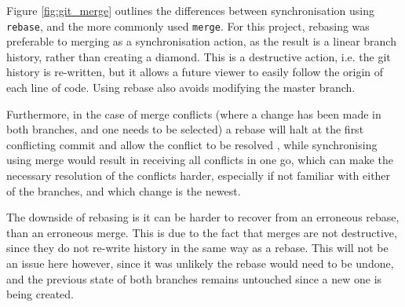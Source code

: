 \begin{figure}[t]
{{{
    }}}
\end{figure}
\par
Figure \ref{fig:git_merge} outlines the differences between synchronisation using \verb|rebase|, and the more commonly used \verb|merge|. For this project, rebasing was preferable to merging as a synchronisation action, as the result is a linear branch history, rather than creating a diamond. This is a destructive action, i.e. the git history is re-written, but it allows a future viewer to easily follow the origin of each line of code. Using rebase also avoids modifying the master branch.
\par
Furthermore, in the case of merge conflicts (where a change has been made in both branches, and one needs to be selected) a rebase will halt at the first conflicting commit and allow the conflict to be resolved \cite{rebase-doc}, while synchronising using merge would result in receiving all conflicts in one go, which can make the necessary resolution of the conflicts harder, especially if not familiar with either of the branches, and which change is the newest.
\par
The downside of rebasing is it can be harder to recover from an erroneous rebase, than an erroneous merge. This is due to the fact that merges are not destructive, since they do not re-write history in the same way as a rebase. This will not be an issue here however, since it was unlikely the rebase would need to be undone, and the previous state of both branches remains untouched since a new one is being created.

